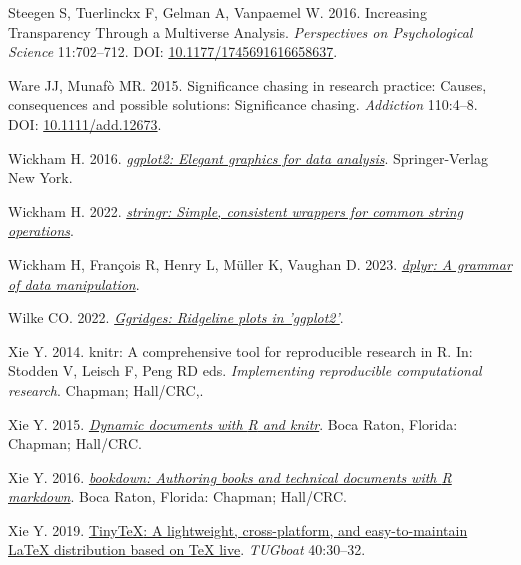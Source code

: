 \documentclass[10pt,a4paper]{article}
\newlength{\cslhangindent}
\newlength{\cslentryspacingunit} %
\newenvironment{CSLReferences}[2] %
 {%
  \setlength{\parindent}{0pt}
  \ifodd #1
  \let\oldpar\par
  \def\par{\hangindent=\cslhangindent\oldpar}
  \fi
  \setlength{\parskip}{#2\cslentryspacingunit}
 }%
 {}
\begin{document}
\begin{CSLReferences}{1}{0}
\leavevmode{}%
Steegen S, Tuerlinckx F, Gelman A, Vanpaemel W. 2016. Increasing {Transparency} {Through} a {Multiverse} {Analysis}. \emph{Perspectives on Psychological Science} 11:702--712. DOI: \href{https://doi.org/10.1177/1745691616658637}{10.1177/1745691616658637}.

\leavevmode{}%
Ware JJ, Munafò MR. 2015. Significance chasing in research practice: Causes, consequences and possible solutions: {Significance} chasing. \emph{Addiction} 110:4--8. DOI: \href{https://doi.org/10.1111/add.12673}{10.1111/add.12673}.

\leavevmode{}%
Wickham H. 2016. \emph{\href{https://ggplot2.tidyverse.org}{ggplot2: Elegant graphics for data analysis}}. Springer-Verlag New York.

\leavevmode{}%
Wickham H. 2022. \emph{\href{https://CRAN.R-project.org/package=stringr}{{stringr}: Simple, consistent wrappers for common string operations}}.

\leavevmode{}%
Wickham H, François R, Henry L, Müller K, Vaughan D. 2023. \emph{\href{https://CRAN.R-project.org/package=dplyr}{{dplyr}: A grammar of data manipulation}}.

\leavevmode{}%
Wilke CO. 2022. \emph{\href{https://CRAN.R-project.org/package=ggridges}{Ggridges: Ridgeline plots in 'ggplot2'}}.

\leavevmode{}%
Xie Y. 2014. {knitr}: A comprehensive tool for reproducible research in {R}. In: Stodden V, Leisch F, Peng RD eds. \emph{Implementing reproducible computational research}. Chapman; Hall/CRC,.

\leavevmode{}%
Xie Y. 2015. \emph{\href{https://yihui.org/knitr/}{Dynamic documents with {R} and knitr}}. Boca Raton, Florida: Chapman; Hall/CRC.

\leavevmode{}%
Xie Y. 2016. \emph{\href{https://bookdown.org/yihui/bookdown}{{bookdown}: Authoring books and technical documents with {R} markdown}}. Boca Raton, Florida: Chapman; Hall/CRC.

\leavevmode{}%
Xie Y. 2019. \href{https://tug.org/TUGboat/Contents/contents40-1.html}{{TinyTeX}: A lightweight, cross-platform, and easy-to-maintain LaTeX distribution based on TeX live}. \emph{TUGboat} 40:30--32.


\end{CSLReferences}
\end{document}
